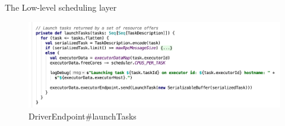 \begin{frame}[plain,t]{The Low-level scheduling layer} %
	 \\  \vspace{2ex}
	\begin{figure}
		\centering
		\includegraphics[width=0.9\linewidth]{images/backend004}
		\caption{DriverEndpoint\#launchTasks}
		\label{fig:backend004}
	\end{figure}
	
	
\end{frame}



